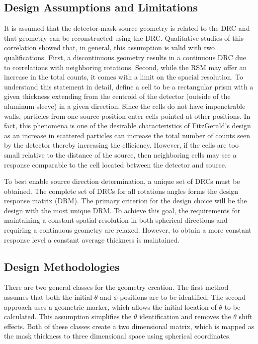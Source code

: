 \documentclass[3p,times]{elsarticle}
\begin{document}
\subsection{Design Assumptions and Limitations}
It is assumed that the detector-mask-source geometry is related to the DRC and that geometry can be reconstructed using the DRC.
Qualitative studies of this correlation showed that, in general, this assumption is valid with two qualifications.  
First, a discontinuous geometry results in a continuous DRC due to correlations with neighboring rotations. 
Second, while the RSM may offer an increase in the total counts, it comes with a limit on the spacial resolution. 
To understand this statement in detail, define a cell to be a rectangular prism with a given thickness extending from the centroid of the detector (outside of the aluminum sleeve) in a given direction.
Since the cells do not have impenetrable walls, particles from one source position enter cells pointed at other positions.  
In fact, this phenomena is one of the desirable characteristics of FitzGerald's design as an increase in scattered particles can increase the total number of counts seen by the detector thereby increasing the efficiency.  
However, if the cells are too small relative to the distance of the source, then neighboring cells may see a response comparable to the cell located between the detector and source.

To best enable source direction determination, a unique set of DRCs must be obtained. 
The complete set of DRCs for all rotations angles forms the design response matrix (DRM).
The primary criterion for the design choice will be the design with the most unique DRM.  
To achieve this goal, the requirements for maintaining a constant spatial resolution in both spherical directions and requiring a continuous geometry are relaxed.  
However, to obtain a more constant response level a constant average thickness is maintained.  

\subsection{Design Methodologies} \label{design-methods}
There are two general classes for the geometry creation.  
The first method assumes that both the initial $\theta$ and $\phi$ positions are to be identified.  
The second approach uses a geometric marker, which allows the initial location of $\theta$ to be calculated.  
This assumption simplifies the $\theta$ identification and removes the $\theta$ shift effects.  
Both of these classes create a two dimensional matrix, which is mapped as the mask thickness to three dimensional space using spherical coordinates.
\end{document}
